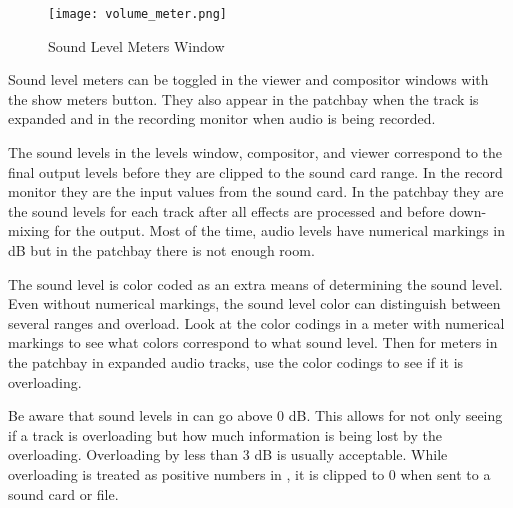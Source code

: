 \begin{wrapfigure}[18]{O}{0.3\linewidth} 
	\centering
	\vspace{-2ex}
	\texttt{[image: volume\_meter.png]}
	\caption{Sound Level Meters Window}
	\label{fig:volume_meter}
\end{wrapfigure}

Sound level meters can be toggled in the viewer and compositor windows with the show meters button.  
They also appear in the patchbay when the track is expanded and in the recording monitor when audio is being recorded. 

The sound levels in the levels window, compositor, and viewer correspond to the final output levels before they are clipped to the sound card range.  
In the record monitor they are the input values from the sound card.  
In the patchbay they are the sound levels for each track after all effects are processed and before down-mixing for the output.  
Most of the time, audio levels have numerical markings in dB but in the patchbay there is not enough room.

The sound level is color coded as an extra means of determining the sound level.  
Even without numerical markings, the sound level color can distinguish between several ranges and overload.  
Look at the color codings in a meter with numerical markings to see what colors correspond to what sound level.  
Then for meters in the patchbay in expanded audio tracks, use the color codings to see if it is overloading.

Be aware that sound levels in \CGG{} can go above 0 dB.  
This allows for not only seeing if a track is overloading but how much information is being lost by the overloading.  
Overloading by less than 3 dB is usually acceptable.  
While overloading is treated as positive numbers in \CGG{}, it is clipped to 0 when sent to a sound card or file.


